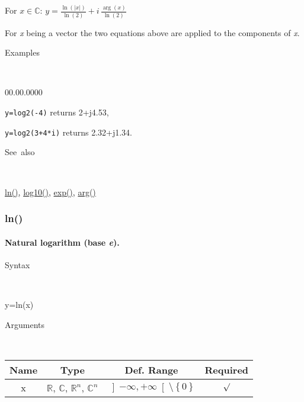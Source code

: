 \medskip{}
For $x\in\mathbb{C}$: $y={\displaystyle \frac{\ln\left(\left|x\right|\right)}{\ln\left(2\right)}}+i\,{\displaystyle \frac{\arg\left(x\right)}{\ln\left(2\right)}}$
\medskip{}

For \textit{x} being a vector the two equations above are
applied to the components of \textit{x}.

\begin{description}
\item [Examples]~
\end{description}
\begin{lyxlist}{00.00.0000}
\item [\texttt{y=log2(-4)}]returns 2+j4.53,
\item [\texttt{y=log2(3+4{*}i)}]returns 2.32+j1.34.
\end{lyxlist}
\begin{description}
\item [See~also]~
\end{description}
\textcolor{blue}{\hyperlink{ln}{ln()}}\textcolor{black}{,}
\textcolor{blue}{\hyperlink{log10}{log10()}}\textcolor{black}{,}
\textcolor{blue}{\hyperlink{exp}{exp()}}\textcolor{black}{,} \textcolor{blue}{\hyperlink{arg}{arg()}}


\newpage
\subsubsection*{\hypertarget{ln}{}{\Large ln()}}


\paragraph{\label{par:Natural-logarithm}Natural logarithm (base \textit{e}).}

\begin{description}
\item [Syntax]~
\end{description}
y=ln(x)

\begin{description}
\item [Arguments]~
\end{description}
\begin{tabular}{|c|c|c|c|}
\hline 
Name&
Type&
Def. Range&
Required\tabularnewline
\hline
\hline 
x&
$\mathbb{R}$, $\mathbb{C}$, $\mathbb{R}^{n}$, $\mathbb{C}^{n}$&
$\left]-\infty,+\infty\right[\setminus\left\{ 0\right\} $&
$\surd$\tabularnewline
\hline
\end{tabular}

